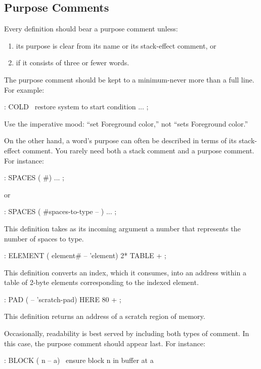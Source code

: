 \subsection{Purpose Comments}%

\begin{tip}
Every definition should bear a purpose comment unless:
\medskip
\begin{enumerate}
\item its purpose is clear from its name or its stack-effect comment, or
\item if it consists of three or fewer words.
\end{enumerate}
\end{tip}
The purpose comment should be kept to a minimum-never more than a full
line.  For example:
\begin{Code}
: COLD   \ restore system to start condition
    ... ;
\end{Code}
Use the imperative mood: ``set Foreground color,'' not ``sets
Foreground color.''

On the other hand, a word's purpose can often be described in terms of
its stack-effect comment.  You rarely need both a stack comment and a
purpose comment.  For instance:
\begin{Code}
: SPACES  ( #)   ... ;
\end{Code}
or
\begin{Code}
: SPACES  ( #spaces-to-type -- )   ... ;
\end{Code}
This definition takes as its incoming argument a number that
represents the number of spaces to type.
\begin{Code}
: ELEMENT  ( element# -- 'element)  2*  TABLE + ;
\end{Code}
This definition converts an index, which it consumes, into an address
within a table of 2-byte elements corresponding to the indexed element.
\begin{Code}
: PAD  ( -- 'scratch-pad)  HERE  80 + ;
\end{Code}
This definition returns an address of a scratch region of memory.

Occasionally, readability is best served by including both types of
comment. In this case, the purpose comment should appear last.  For
instance:
\begin{Code}
: BLOCK  ( n -- a)  \   ensure block n in buffer at a
\end{Code}

